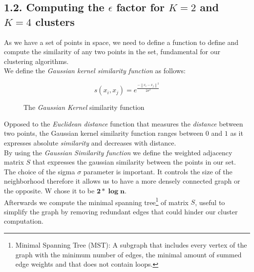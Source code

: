 \documentclass[unicode,11pt,a4paper,oneside,numbers=endperiod,openany]{scrartcl}
\begin{document}
\clearpage
\subsection*{1.2. Computing the $\epsilon$ factor for $K=2$ and $K=4$ clusters}
As we have a set of points in space, we need to define a function to define and compute the similarity of any two points in the set, fundamental for our clustering algorithms.\\
We define the \textit{Gaussian kernel similarity function} as follows:
\begin{figure}[h!]
$$ s\left(x_i, x_j\right)=e^{\frac{-\left\|x_i-x_j\right\|^2}{2 \sigma^2}}$$
\caption{The \textit{Gaussian Kernel} similarity function}
\end{figure}
Opposed to the \textit{Euclidean distance} function that measures the \textit{distance} between two points, the Gaussian kernel similarity function ranges between $0$ and $1$ as it expresses absolute \textit{similarity} and decreases with distance.\\ 

By using the \textit{Gaussian Similarity function} we define the weighted adjacency matrix $S$ that expresses the gaussian similarity between the points in our set.\\
The choice of the sigma $\sigma$ parameter is important. It controls the size of the neighborhood therefore it allows us to have a more densely connected graph or the opposite. W chose it to be $\mathbf{2*\log n}$.\\

Afterwards we compute the minimal spanning tree\footnote{Minimal Spanning Tree (MST): A subgraph that includes every vertex of the graph with the minimum number of edges, the minimal amount of summed edge weights and that does not contain loops. } of matrix $S$, useful to simplify the graph by removing redundant edges that could hinder our cluster computation.\\
\end{document}
